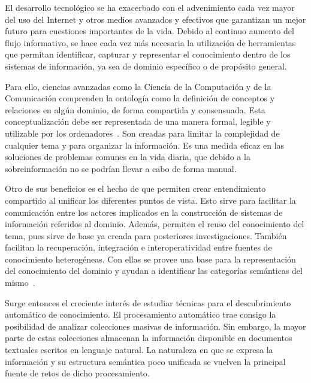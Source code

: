 \label{chapter:introduction}


El desarrollo tecnológico se ha exacerbado con el advenimiento cada vez mayor del uso del Internet y otros medios avanzados y efectivos que garantizan un mejor futuro para cuestiones importantes de la vida. Debido al continuo aumento del flujo informativo, se hace cada vez más necesaria la utilización de herramientas que permitan identificar, capturar y representar el conocimiento dentro de los sistemas de información, ya sea de dominio específico o de propósito general.

Para ello, ciencias avanzadas como la Ciencia de la Computación y de la Comunicación comprenden la ontología como la definición de conceptos y relaciones en algún dominio, de forma compartida y consensuada. Esta conceptualización debe ser representada de una manera formal, legible y utilizable por los ordenadores~\cite{ref:30}. Son creadas para limitar la complejidad de cualquier tema y para organizar la información. Es una medida eficaz en las soluciones de problemas comunes en la vida diaria, que debido a la sobreinformación no se podrían llevar a cabo de forma manual.

Otro de sus beneficios es el hecho de que permiten crear entendimiento compartido al unificar los diferentes puntos de vista. Esto sirve para facilitar la comunicación entre los actores implicados en la construcción de sistemas de información referidos al dominio. Además, permiten el reuso del conocimiento del tema, pues sirve de base ya creada para posteriores investigaciones. También facilitan la recuperación, integración e interoperatividad entre fuentes de conocimiento heterogéneas. Con ellas se provee una base para la representación del conocimiento del dominio y ayudan a identificar las categorías semánticas del mismo~\cite{ref:1}.

Surge entonces el creciente interés de estudiar técnicas para el descubrimiento automático de conocimiento. El procesamiento automático trae consigo la posibilidad de analizar colecciones masivas de información. Sin embargo, la mayor parte de estas colecciones almacenan la información disponible en documentos textuales escritos en lenguaje natural. La naturaleza en que se expresa la información y su estructura semántica poco unificada se vuelven la principal fuente de retos de dicho procesamiento.


